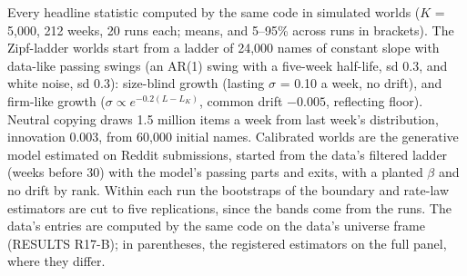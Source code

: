 \documentclass[10pt]{article}
\begin{document}
Every headline statistic computed by the same code in simulated worlds ($K$ = 5,000, 212 weeks, 20 runs each; means, and 5--95\% across runs in brackets). The Zipf-ladder worlds start from a ladder of 24,000 names of constant slope with data-like passing swings (an AR(1) swing with a five-week half-life, sd 0.3, and white noise, sd 0.3): size-blind growth (lasting $\sigma$ = 0.10 a week, no drift), and firm-like growth ($\sigma \propto e^{-0.2(L-L_K)}$, common drift $-0.005$, reflecting floor). Neutral copying draws 1.5 million items a week from last week's distribution, innovation 0.003, from 60,000 initial names. Calibrated worlds are the generative model estimated on Reddit submissions, started from the data's filtered ladder (weeks before 30) with the model's passing parts and exits, with a planted $\beta$ and no drift by rank. Within each run the bootstraps of the boundary and rate-law estimators are cut to five replications, since the bands come from the runs. The data's entries are computed by the same code on the data's universe frame (RESULTS R17-B); in parentheses, the registered estimators on the full panel, where they differ.
\begin{center}\small{}\end{center}
\end{document}
